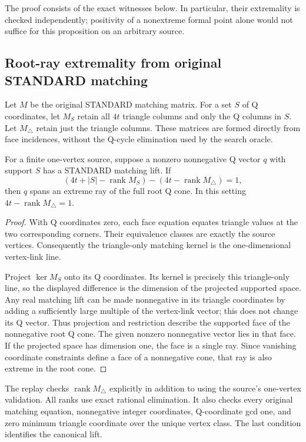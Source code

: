 The proof consists of the exact witnesses below.  In particular, their
extremality is checked independently; positivity of a nonextreme formal
point alone would not suffice for this proposition on an arbitrary source.

\subsection{Root-ray extremality from original STANDARD matching}

Let $M$ be the original STANDARD matching matrix.  For a set $S$ of Q
coordinates, let $M_S$ retain all $4t$ triangle columns and only the Q
columns in $S$.  Let $M_\triangle$ retain just the triangle columns.
These matrices are formed directly from face incidences, without the
Q-cycle elimination used by the search oracle.

\begin{lemma}
\label{lem:boundary-original-standard-rank}
For a finite one-vertex source, suppose a nonzero nonnegative Q vector
$q$ with support $S$ has a STANDARD matching lift.  If
\[
 (4t+|S|-\operatorname{rank}M_S)
       -(4t-\operatorname{rank}M_\triangle)=1,
\]
then $q$ spans an extreme ray of the full root Q cone.  In this setting
$4t-\operatorname{rank}M_\triangle=1$.
\end{lemma}
\begin{proof}
With Q coordinates zero, each face equation equates triangle values at
the two corresponding corners.  Their equivalence classes are exactly
the source vertices.  Consequently the triangle-only matching kernel
is the one-dimensional vertex-link line.

Project $\ker M_S$ onto its Q coordinates.  Its kernel is precisely
this triangle-only line, so the displayed difference is the dimension
of the projected supported space.  Any real matching lift can be made
nonnegative in its triangle coordinates by adding a sufficiently large
multiple of the vertex-link vector; this does not change its Q vector.
Thus projection and restriction describe the supported face of the
nonnegative root Q cone.  The given nonzero nonnegative vector lies in
that face.  If the projected space has dimension one, the face is a
single ray.  Since vanishing coordinate constraints define a face of
a nonnegative cone, that ray is also extreme in the root cone.
\end{proof}

The replay checks $\operatorname{rank}M_\triangle$ explicitly in
addition to using the source's one-vertex validation.  All ranks use
exact rational elimination.  It also checks every original matching
equation, nonnegative integer coordinates, Q-coordinate gcd one, and
zero minimum triangle coordinate over the unique vertex class.
The last condition identifies the canonical lift.

